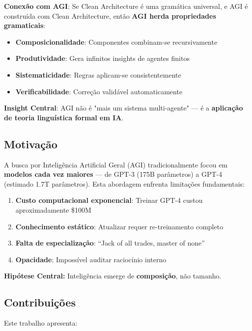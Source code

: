 \documentclass[11pt]{article}
\begin{document}
\textbf{Conexão com AGI}: Se Clean Architecture é uma gramática universal, e AGI é construída com Clean Architecture, então \textbf{AGI herda propriedades gramaticais}:

\begin{itemize}
    \item \textbf{Composicionalidade}: Componentes combinam-se recursivamente
    \item \textbf{Produtividade}: Gera infinitos insights de agentes finitos
    \item \textbf{Sistematicidade}: Regras aplicam-se consistentemente
    \item \textbf{Verificabilidade}: Correção validável automaticamente
\end{itemize}

\textbf{Insight Central}: AGI não é "mais um sistema multi-agente" --- é a \textbf{aplicação de teoria linguística formal em IA}.

\subsection{Motivação}

A busca por Inteligência Artificial Geral (AGI) tradicionalmente focou em \textbf{modelos cada vez maiores} --- de GPT-3 (175B parâmetros) a GPT-4 (estimado 1.7T parâmetros). Esta abordagem enfrenta limitações fundamentais:

\begin{enumerate}
    \item \textbf{Custo computacional exponencial}: Treinar GPT-4 custou aproximadamente \$100M
    \item \textbf{Conhecimento estático}: Atualizar requer re-treinamento completo
    \item \textbf{Falta de especialização}: ``Jack of all trades, master of none''
    \item \textbf{Opacidade}: Impossível auditar raciocínio interno
\end{enumerate}

\textbf{Hipótese Central:} Inteligência emerge de \textbf{composição}, não tamanho.

\subsection{Contribuições}

Este trabalho apresenta:
\end{document}

